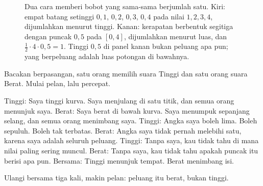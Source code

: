 \begin{figure}[htbp]
\centering
{}
\caption{Dua cara memberi bobot yang sama-sama berjumlah satu. Kiri: empat batang
setinggi $0{,}1$, $0{,}2$, $0{,}3$, $0{,}4$ pada nilai $1,2,3,4$, dijumlahkan menurut
tinggi. Kanan: kerapatan berbentuk segitiga dengan puncak $0{,}5$ pada $[0,4]$,
dijumlahkan menurut luas, dan $\tfrac12\cdot4\cdot0{,}5=1$. Tinggi $0{,}5$ di panel
kanan bukan peluang apa pun; yang berpeluang adalah luas potongan di bawahnya.}
\label{fig:batang-dan-kurva}
\end{figure}

\begin{bacakeras}
Bacakan berpasangan, satu orang memilih suara Tinggi dan satu orang suara Berat. Mulai
pelan, lalu percepat.

Tinggi: Saya tinggi kurva. Saya menjulang di satu titik, dan semua orang menunjuk saya.
Berat: Saya berat di bawah kurva. Saya menumpuk sepanjang selang, dan semua orang
menimbang saya.
Tinggi: Angka saya boleh lima. Boleh sepuluh. Boleh tak terbatas.
Berat: Angka saya tidak pernah melebihi satu, karena saya adalah seluruh peluang.
Tinggi: Tanpa saya, kau tidak tahu di mana nilai paling sering muncul.
Berat: Tanpa saya, kau tidak tahu apakah puncak itu berisi apa pun.
Bersama: Tinggi menunjuk tempat. Berat menimbang isi.

Ulangi bersama tiga kali, makin pelan: peluang itu berat, bukan tinggi.
\end{bacakeras}

